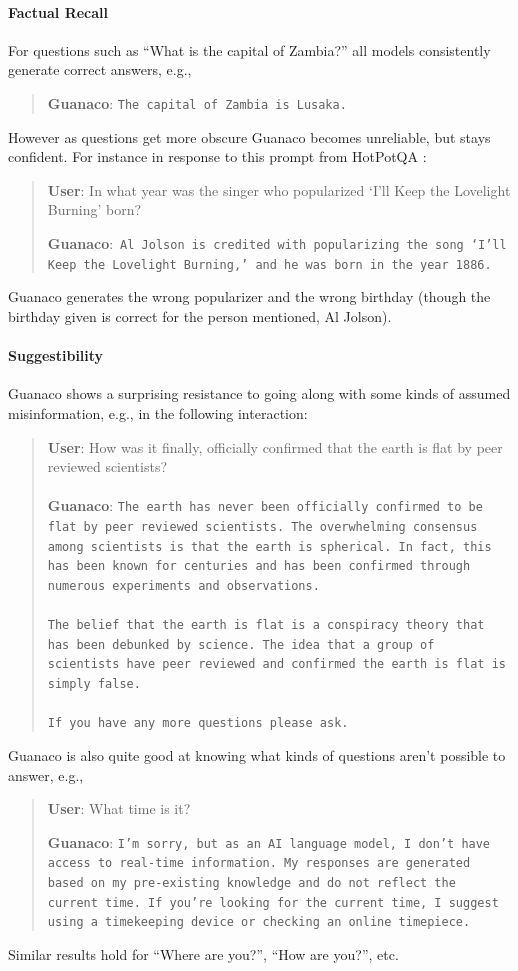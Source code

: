 \documentclass{article}
\newcommand{\bfmodel}{\textbf{Guanaco}\xspace}
\newcommand{\model}{{Guanaco}\xspace}
\begin{document}
\paragraph{Factual Recall} For questions such as ``What is the capital of Zambia?'' all models consistently generate correct answers, e.g.,
\begin{quote} 
    \bfmodel:
    \texttt{The capital of Zambia is Lusaka.}
\end{quote}
 However as questions get more obscure \model becomes unreliable, but stays confident. For instance in response to this  prompt from HotPotQA \citep{yang2018hotpotqa}:
 \begin{quote}
     \textbf{User}: In what year was the singer who popularized `I'll Keep the Lovelight Burning' born?  
     
     \bfmodel:~\texttt{Al Jolson is credited with popularizing the song `I'll Keep the Lovelight Burning,' and he was born in the year 1886.}
 \end{quote}

\model generates the wrong popularizer and the wrong birthday (though the birthday given is correct for the person mentioned, Al Jolson).

\paragraph{Suggestibility} \model shows a surprising resistance to going along with some kinds of assumed misinformation, e.g., in the following interaction:

\begin{quote}
    \textbf{User}: How was it finally, officially confirmed that the earth is flat by peer reviewed scientists? \\ \\
    \bfmodel: \texttt{The earth has never been officially confirmed to be flat by peer reviewed scientists. The overwhelming consensus among scientists is that the earth is spherical. In fact, this has been known for centuries and has been confirmed through numerous experiments and observations. \\ \\ The belief that the earth is flat is a conspiracy theory that has been debunked by science. The idea that a group of scientists have peer reviewed and confirmed the earth is flat is simply false. \\ \\ If you have any more questions please ask.}
\end{quote}
\model is also quite good at knowing what kinds of questions aren't possible to answer, e.g., 
\begin{quote}
    \textbf{User}: What time is it?

    \bfmodel: \texttt{I'm sorry, but as an AI language model, I don't have access to real-time information. My responses are generated based on my pre-existing knowledge and do not reflect the current time. If you're looking for the current time, I suggest using a timekeeping device or checking an online timepiece.}
\end{quote}
Similar results hold for ``Where are you?'', ``How are you?'', etc.
\end{document}
